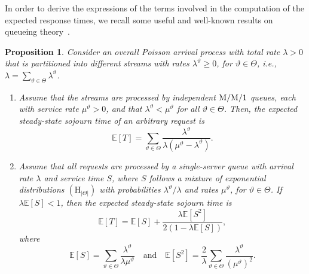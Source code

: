 \documentclass[a4paper,11pt,reqno]{amsart}
\newtheorem{proposition}{Proposition}
\begin{document}
In order to derive the expressions of the terms involved in the computation of the expected response times, we recall some useful and well-known results on queueing theory~\citep[see, e.g.,][]{gross2008fundamentals,kleinrock1975queueing,wolff1989stochastic}.

\begin{proposition}\label{prop:ET_general}
Consider an overall Poisson arrival process with total rate $\lambda>0$ that is partitioned into different streams with rates $\lambda^\vartheta \ge 0$, for $\vartheta \in \Theta$, i.e., $\lambda=\sum_{\vartheta\in \Theta} \lambda^\vartheta$.

\begin{enumerate}[label=\roman*), ref={\roman*}]
\item \label{prop:dsr}
Assume that the streams are processed by independent ${\rm M/M/1}$ queues, each with service rate $\mu^\vartheta>0$, and that $\lambda^\vartheta<\mu^\vartheta$ for all $\vartheta \in \Theta$. Then, the expected steady-state sojourn time of an arbitrary request is
$$
\mathbb{E}[T]
= \sum_{\vartheta \in \Theta} \frac{\lambda^\vartheta}{\lambda (\mu^\vartheta - \lambda^\vartheta)}.
$$

\item \label{prop:isr}
Assume that all requests are processed by a single-server queue with arrival rate $\lambda$ and service time $S$, where $S$ follows a mixture of exponential distributions $(\mathrm{H}_{|\Theta|})$ with probabilities $\lambda^\vartheta/\lambda$ and rates $\mu^\vartheta$, for $\vartheta \in \Theta$. If $\lambda \mathbb{E}[S] < 1$, then the expected steady-state sojourn time is
\begin{equation}\label{eq:pollaczek-khinchine}
    \mathbb{E}[T]
=
\mathbb{E}[S]
+
\frac{\lambda \mathbb{E}[S^2]}{2(1-\lambda \mathbb{E}[S])},
\end{equation}
where
$$
\mathbb{E}[S]
= \sum_{\vartheta \in\Theta} \frac{\lambda^\vartheta}{\lambda \mu^\vartheta}
\quad \text{and} \quad
\mathbb{E}[S^2]
= \frac{2}{\lambda} \sum_{\vartheta \in \Theta} \frac{\lambda^\vartheta}{(\mu^\vartheta)^2}.
$$
\end{enumerate}
\end{proposition}
\end{document}

